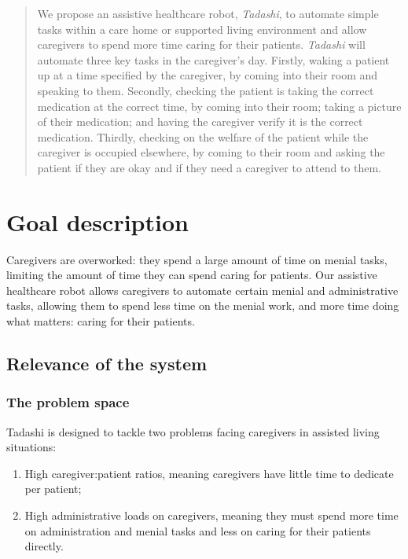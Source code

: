 \documentclass{article}
\begin{document}
 



\begin{abstract}
  We propose an assistive healthcare robot, {\it Tadashi}, to automate simple tasks within a care home or supported living environment and allow caregivers to spend more time caring for their patients.
  {\it Tadashi} will automate three key tasks in the caregiver's day. Firstly, waking a patient up at a time specified by the caregiver, by coming into their room and speaking to them. Secondly, checking the patient is taking the correct medication at the correct time, by coming into their room; taking a picture of their medication; and having the caregiver verify it is the correct medication. Thirdly, checking on the welfare of the patient while the caregiver is occupied elsewhere, by coming to their room and asking the patient if they are okay and if they need a caregiver to attend to them. 
\end{abstract} 

\section{Goal description}
Caregivers are overworked: they spend a large amount of time on menial tasks, limiting the amount of time they can spend caring for patients. Our assistive healthcare robot allows caregivers to automate certain menial and administrative tasks, allowing them to spend less time on the menial work, and more time doing what matters: caring for their patients. 

\subsection{Relevance of the system}
\subsubsection{The problem space}
Tadashi is designed to tackle two problems facing caregivers in assisted living situations:
\begin{enumerate}
\item High caregiver:patient ratios, meaning caregivers have little time to dedicate per patient;
\item High administrative loads on caregivers, meaning they must spend more time on administration and menial tasks and less on caring for their patients directly.
\end{enumerate}
\end{document}
